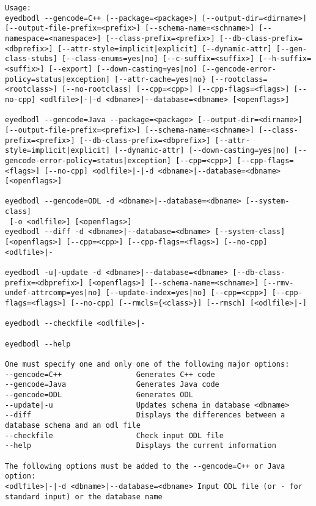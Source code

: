 \begin{verbatim}
Usage:
eyedbodl --gencode=C++ [--package=<package>] [--output-dir=<dirname>] [--output-file-prefix=<prefix>] [--schema-name=<schname>] [--namespace=<namespace>] [--class-prefix=<prefix>] [--db-class-prefix=<dbprefix>] [--attr-style=implicit|explicit] [--dynamic-attr] [--gen-class-stubs] [--class-enums=yes|no] [--c-suffix=<suffix>] [--h-suffix=<suffix>] [--export] [--down-casting=yes|no] [--gencode-error-policy=status|exception] [--attr-cache=yes|no} [--rootclass=<rootclass>] [--no-rootclass] [--cpp=<cpp>] [--cpp-flags=<flags>] [--no-cpp] <odlfile>|-|-d <dbname>|--database=<dbname> [<openflags>]

eyedbodl --gencode=Java --package=<package> [--output-dir=<dirname>] [--output-file-prefix=<prefix>] [--schema-name=<schname>] [--class-prefix=<prefix>] [--db-class-prefix=<dbprefix>] [--attr-style=implicit|explicit] [--dynamic-attr] [--down-casting=yes|no] [--gencode-error-policy=status|exception] [--cpp=<cpp>] [--cpp-flags=<flags>] [--no-cpp] <odlfile>|-|-d <dbname>|--database=<dbname> [<openflags>]

eyedbodl --gencode=ODL -d <dbname>|--database=<dbname> [--system-class]
 [-o <odlfile>] [<openflags>]
eyedbodl --diff -d <dbname>|--database=<dbname> [--system-class] [<openflags>] [--cpp=<cpp>] [--cpp-flags=<flags>] [--no-cpp] <odlfile>|-

eyedbodl -u|-update -d <dbname>|--database=<dbname> [--db-class-prefix=<dbprefix>] [<openflags>] [--schema-name=<schname>] [--rmv-undef-attrcomp=yes|no] [--update-index=yes|no] [--cpp=<cpp>] [--cpp-flags=<flags>] [--no-cpp] [--rmcls={<class>}] [--rmsch] [<odlfile>|-]

eyedbodl --checkfile <odlfile>|-

eyedbodl --help

One must specify one and only one of the following major options:
--gencode=C++                 Generates C++ code
--gencode=Java                Generates Java code
--gencode=ODL                 Generates ODL
--update|-u                   Updates schema in database <dbname>
--diff                        Displays the differences between a database schema and an odl file
--checkfile                   Check input ODL file
--help                        Displays the current information

The following options must be added to the --gencode=C++ or Java option:
<odlfile>|-|-d <dbname>|--database=<dbname> Input ODL file (or - for standard input) or the database name


\end{verbatim}
